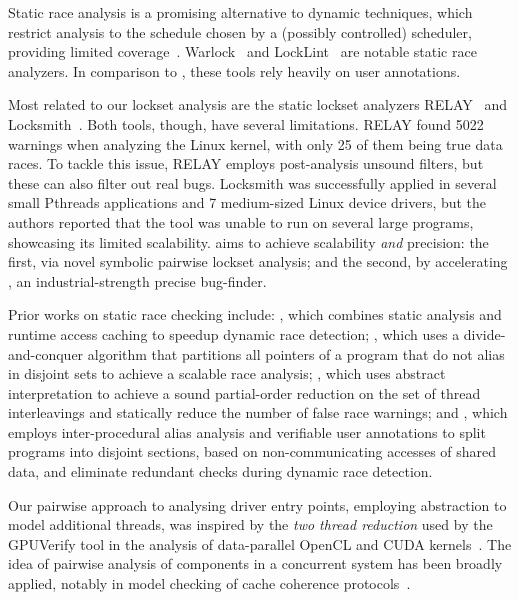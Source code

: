 Static race analysis is a promising alternative to dynamic techniques, which restrict analysis to the schedule chosen by a (possibly controlled) scheduler, providing limited coverage~\cite{musuvathi2008finding}. Warlock~\cite{sterling1993warlock} and LockLint~\cite{oracle2010locklint} are notable static race analyzers.  In comparison to \whoop, these tools rely heavily on user annotations.

Most related to our lockset analysis are the static lockset analyzers RELAY~\cite{voung2007relay} and Locksmith~\cite{pratikakis2006locksmith}. Both tools, though, have several limitations. RELAY found 5022 warnings when analyzing the Linux kernel, with only 25 of them being true data races. To tackle this issue, RELAY employs post-analysis unsound filters, but these can also filter out real bugs. Locksmith was successfully applied in several small Pthreads applications and 7 medium-sized Linux device drivers, but the authors reported that the tool was unable to run on several large programs, showcasing its limited scalability. \whoop aims to achieve scalability \emph{and} precision: the first, via novel symbolic pairwise lockset analysis; and the second, by accelerating \corral, an industrial-strength precise bug-finder.

Prior works on static race checking include: \cite{choi2002efficient}, which combines static analysis and runtime access caching to speedup dynamic race detection; \cite{kahlon2007fast}, which uses a divide-and-conquer algorithm that partitions all pointers of a program that do not alias in disjoint sets to achieve a scalable race analysis; \cite{kahlon2009semantic}, which uses abstract interpretation to achieve a sound partial-order reduction on the set of thread interleavings and statically reduce the number of false race warnings; and \cite{das2015section}, which employs inter-procedural alias analysis and verifiable user annotations to split programs into disjoint sections, based on non-communicating accesses of shared data, and eliminate redundant checks during dynamic race detection.

Our pairwise approach to analysing driver entry points, employing abstraction to model additional threads, was inspired by the \emph{two thread reduction} used by the GPUVerify tool in the analysis of data-parallel OpenCL and CUDA kernels~\cite{gpuverify,bardsley2014engineering}.  The idea of pairwise analysis of components in a concurrent system has been broadly applied, notably in model checking of cache coherence protocols~\cite{mcmillan1999verification}.
